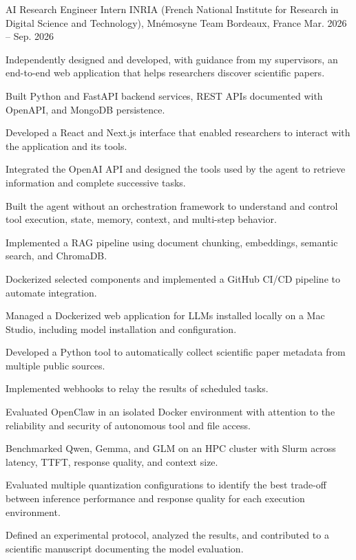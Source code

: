 
\begin{cventries}
  \cventry
    {AI Research Engineer Intern}
    {INRIA (French National Institute for Research in Digital Science and Technology), Mnémosyne Team}
    {Bordeaux, France}
    {Mar. 2026 -- Sep. 2026}
    {
      \begin{cvitems}
        \item {Independently designed and developed, with guidance from my supervisors, an end-to-end web application that helps researchers discover scientific papers.}
        \item {Built Python and FastAPI backend services, REST APIs documented with OpenAPI, and MongoDB persistence.}
        \item {Developed a React and Next.js interface that enabled researchers to interact with the application and its tools.}
        \item {Integrated the OpenAI API and designed the tools used by the agent to retrieve information and complete successive tasks.}
        \item {Built the agent without an orchestration framework to understand and control tool execution, state, memory, context, and multi-step behavior.}
        \item {Implemented a RAG pipeline using document chunking, embeddings, semantic search, and ChromaDB.}
        \item {Dockerized selected components and implemented a GitHub CI/CD pipeline to automate integration.}
        \item {Managed a Dockerized web application for LLMs installed locally on a Mac Studio, including model installation and configuration.}
        \item {Developed a Python tool to automatically collect scientific paper metadata from multiple public sources.}
        \item {Implemented webhooks to relay the results of scheduled tasks.}
        \item {Evaluated OpenClaw in an isolated Docker environment with attention to the reliability and security of autonomous tool and file access.}
        \item {Benchmarked Qwen, Gemma, and GLM on an HPC cluster with Slurm across latency, TTFT, response quality, and context size.}
        \item {Evaluated multiple quantization configurations to identify the best trade-off between inference performance and response quality for each execution environment.}
        \item {Defined an experimental protocol, analyzed the results, and contributed to a scientific manuscript documenting the model evaluation.}
      \end{cvitems}
    }


\end{cventries}
